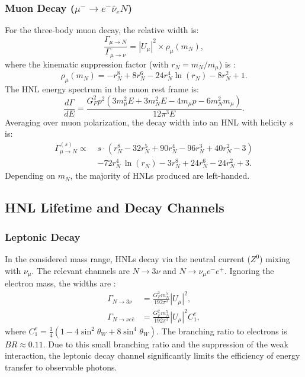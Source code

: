 \documentclass{article}
\newcommand{\mN}{m_N}
\newcommand{\mmu}{m_\mu}
\begin{document}
\subsubsection{Muon Decay ($\mu^- \to e^- \bar{\nu}_e N$)}

For the three-body muon decay, the relative width is:
\begin{equation}
  \frac{\Gamma_{\mu \to N}}{\Gamma_{\mu \to \nu}} = |U_{\mu}|^2 \times \rho_\mu(m_N),
\end{equation}
where the kinematic suppression factor (with $r_N = m_N / m_\mu$) is \cite{Bondarenko_2018}:
\begin{equation}
  \rho_\mu(m_N) = - r_N^8 + 8 r_N^6 - 24 r_N^4 \ln(r_N) - 8 r_N^2 + 1. \label{eq:rho_mu}
\end{equation}
The HNL energy spectrum in the muon rest frame is:
\begin{equation}
  \frac{d\Gamma}{dE} = \frac{G_F^2 p^2 (3 \mmu^2 E + 3 \mN^2 E - 4 \mmu p - 6 \mN^2 \mmu)}{12 \pi^3 E}. \label{eq:mu_HNL_spec}
\end{equation}
Averaging over muon polarization, the decay width into an HNL with helicity $s$ is:
\begin{equation}
  \begin{split}
    \Gamma_{\mu \to N}^{(s)} \propto \; & s \cdot (r_N^8-32 r_N^5+90 r_N^4-96 r_N^3+40 r_N^2-3) \\ 
                                        & -72 r_N^4 \, \ln{(r_N)} -3 r_N^8+24 r_N^6-24 r_N^2+3.
  \end{split} \label{eq:mu_HNL_pol}
\end{equation}
Depending on $m_N$, the majority of HNLs produced are left-handed.

\subsection{HNL Lifetime and Decay Channels} \label{sec:decay}

\subsubsection{Leptonic Decay}
In the considered mass range, HNLs decay via the neutral current ($Z^0$) mixing with $\nu_\mu$. The relevant channels are $N \to 3\nu$ and $N \to \nu_\mu e^- e^+$. Ignoring the electron mass, the widths are \cite{Bondarenko_2018}:
\begin{align}
  \Gamma_{N \to 3\nu}          & = \frac{G_F^2 m_N^5}{192 \pi^3} |U_\mu|^2, \label{eq:HNL_3nu_decay} \\
  \Gamma_{N \to \nu e \bar{e}} & = \frac{G_F^2 m_N^5}{192 \pi^3} |U_\mu|^2 C_1^e, \label{eq:HNL_nuee_decay}
\end{align}
where $C_1^e = \frac{1}{4}(1 - 4 \sin^2 \theta_W + 8 \sin^4 \theta_W)$. The branching ratio to electrons is $BR \approx 0.11$. Due to this small branching ratio and the suppression of the weak interaction, the leptonic decay channel significantly limits the efficiency of energy transfer to observable photons. 
\end{document}
